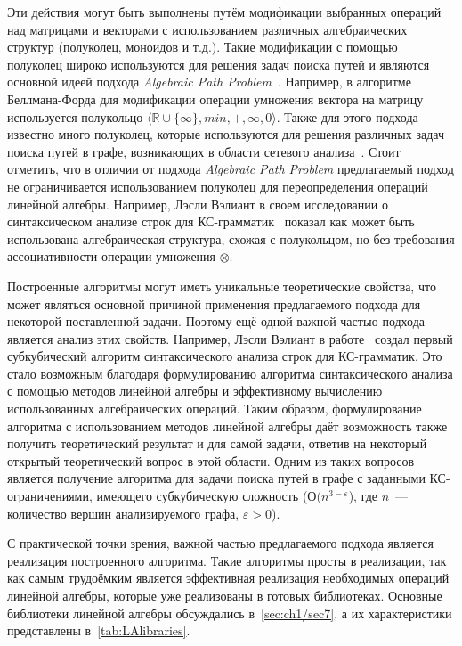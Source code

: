 Эти действия могут быть выполнены путём модификации выбранных операций над матрицами и векторами с использованием различных алгебраических структур (полуколец, моноидов и т.д.). Такие модификации с помощью полуколец широко используются для решения задач поиска путей и являются основной идеей подхода \textit{Algebraic Path Problem}~\cite{rote1990path}. Например, в алгоритме Беллмана-Форда для модификации операции умножения вектора на матрицу используется полукольцо $\langle \mathbb{R} \cup \{\infty\}, min, +, \infty, 0 \rangle$. Также для этого подхода известно много полуколец, которые используются для решения различных задач поиска путей в графе, возникающих в области сетевого анализа~\cite{baras2010path}. Стоит отметить, что в отличии от подхода \textit{Algebraic Path Problem} предлагаемый подход не ограничивается использованием полуколец для переопределения операций линейной алгебры. Например, Лэсли Вэлиант в своем исследовании о синтаксическом анализе строк для КС-грамматик~\cite{valiant1975general} показал как может быть использована алгебраическая структура, схожая с полукольцом, но без требования ассоциативности операции умножения $\otimes$.

Построенные алгоритмы могут иметь уникальные теоретические свойства, что может являться основной причиной применения предлагаемого подхода для некоторой поставленной задачи. Поэтому ещё одной важной частью подхода является анализ этих свойств.  Например, Лэсли Вэлиант в работе~\cite{valiant1975general} создал первый субкубический алгоритм синтаксического анализа строк для КС-грамматик. Это стало возможным благодаря формулированию алгоритма синтаксического анализа с помощью методов линейной алгебры и эффективному вычислению использованных алгебраических операций. Таким образом, формулирование алгоритма с использованием методов линейной алгебры даёт возможность также получить теоретический результат и для самой задачи, ответив на некоторый открытый теоретический вопрос в этой области. Одним из таких вопросов является получение алгоритма для задачи поиска путей в графе с заданными КС-ограничениями, имеющего субкубическую сложность ($О(n^{3 - \varepsilon}$), где $n$~--- количество вершин анализируемого графа, $\varepsilon > 0$). %


С практической точки зрения, важной частью предлагаемого подхода является реализация построенного алгоритма. Такие алгоритмы просты в реализации, так как самым трудоёмким является эффективная реализация необходимых операций линейной алгебры, которые уже реализованы в готовых библиотеках. Основные библиотеки линейной алгебры обсуждались в~\cref{sec:ch1/sec7}, а их характеристики представлены в~\cref{tab:LAlibraries}.

